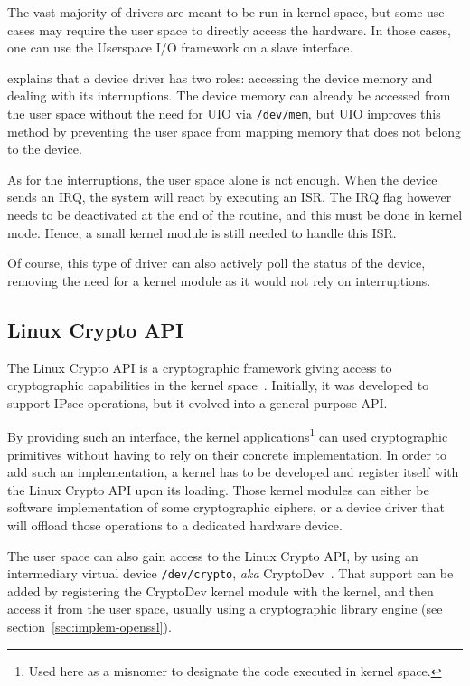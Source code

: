 The vast majority of drivers are meant to be run in kernel space, but some use cases may require the user space to directly access the hardware.
In those cases, one can use the Userspace I/O framework on a slave interface.

\citet{koch2011} explains that a device driver has two roles: accessing the device memory and dealing with its interruptions.
The device memory can already be accessed from the user space without the need for UIO via \texttt{/dev/mem}, but UIO improves this method by preventing the user space from mapping memory that does not belong to the device.

\noindent As for the interruptions, the user space alone is not enough.
When the device sends an IRQ, the system will react by executing an ISR.
The IRQ flag however needs to be deactivated at the end of the routine, and this must be done in kernel mode.
Hence, a small kernel module is still needed to handle this ISR.

\noindent Of course, this type of driver can also actively poll the status of the device, removing the need for a kernel module as it would not rely on interruptions.


\subsection{Linux Crypto API}
The Linux Crypto API is a cryptographic framework giving access to cryptographic capabilities in the kernel space~\cite{morris2003}.
Initially, it was developed to support IPsec operations, but it evolved into a general-purpose API.

By providing such an interface, the kernel applications\footnote{Used here as a misnomer to designate the code executed in kernel space.} can used cryptographic primitives without having to rely on their concrete implementation.
In order to add such an implementation, a kernel has to be developed and register itself with the Linux Crypto API upon its loading.
Those kernel modules can either be software implementation of some cryptographic ciphers, or a device driver that will offload those operations to a dedicated hardware device.\newline{}

The user space can also gain access to the Linux Crypto API, by using an intermediary virtual device \texttt{/dev/crypto}, \textit{aka} CryptoDev~\cite{cryptodev}.
That support can be added by registering the CryptoDev kernel module with the kernel, and then access it from the user space, usually using a cryptographic library engine (see section~\ref{sec:implem-openssl}).


